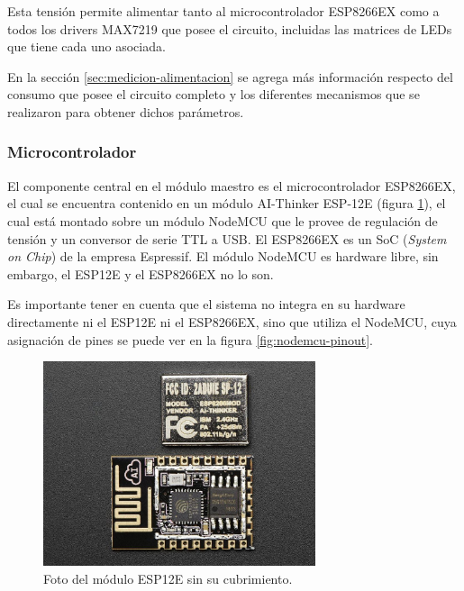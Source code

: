 Esta tensión permite alimentar tanto al microcontrolador ESP8266EX como a todos los drivers MAX7219 que posee el circuito, incluidas las matrices de LEDs que tiene cada uno asociada.

En la sección \ref{sec:medicion-alimentacion} se agrega más información respecto del consumo que posee el  circuito completo y los diferentes mecanismos que se realizaron para obtener dichos parámetros.

\subsubsection{Microcontrolador} \label{sec:microcontrolador}
El componente central en el módulo maestro es el microcontrolador ESP8266EX, el cual se encuentra contenido en un módulo AI-Thinker ESP-12E (figura \ref{fig:foto-esp12e}), el cual está montado sobre un módulo NodeMCU que le provee de regulación de tensión y un conversor de serie TTL a USB. El ESP8266EX es un SoC (\emph{System on Chip}) de la empresa Espressif. El módulo NodeMCU es hardware libre, sin embargo, el ESP12E y el ESP8266EX no lo son.\cite{NodeMCU}

Es importante tener en cuenta que el sistema no integra en su hardware directamente ni el ESP12E ni el ESP8266EX, sino que utiliza el NodeMCU, cuya asignación de pines se puede ver en la figura \ref{fig:nodemcu-pinout}.

\begin{figure}[ht!]
	\begin{center}
		\includegraphics[width=8cm]{imagenes/esp12e-foto.jpg}
		\caption{Foto del módulo ESP12E sin su cubrimiento.}
		\label{fig:foto-esp12e}
	\end{center}
\end{figure}

